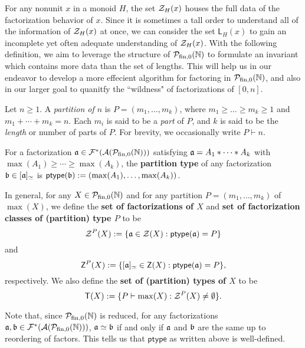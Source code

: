 For any nonunit $x$ in a monoid $H$, the set $\Z_H(x)$ houses the full data of the factorization behavior of $x$. 
Since it is sometimes a tall order to understand all of the information of $\Z_H(x)$ at once, we can consider the set $\mathsf{L}_H(x)$ to gain an incomplete yet often adequate understanding of $\Z_H(x)$.
With the following definition, we aim to leverage the structure of $\PN$ to formulate an invariant which contains more data than the set of lengths.
This will help us in our endeavor to develop a more effecient algorithm for factoring in $\PN$, and also in our larger goal to quanitfy the ``wildness" of factorizations of $[ 0,n]$.


\begin{defn} \label{def:partition type}
	Let $n\ge 1$. A \textit{partition of $n$} is $P = (m_1,\dots, m_k)$, where $m_1 \ge \dots \ge m_k \ge 1$ and $m_1+\cdots + m_k = n$. 
	Each $m_i$ is said to be a \textit{part} of $P$, and $k$ is said to be the \textit{length} or number of parts of $P$.
	For brevity, we occasionally write $P \vdash n$.
	
	For a factorization $\aa \in \F^*(\A(\PN))$ satisfying $\aa = A_1*\cdots*A_k$ with $\max(A_1)\ge\cdots\ge\max(A_k)$, the \textbf{partition type} of any factorization $\bb\in [\aa]_\simeq$ is $\mathsf{ptype}(\bb) := (\max(A_1),\dots,\max(A_k))$.
	
	In general, for any $X \in \PN$ and for any partition $P = (m_1,\dots, m_k)$ of $\max(X)$, we define the \textbf{set of factorizations of $X$} and \textbf{set of factorization classes of (partition) type $P$} to be
	\[ \Z^P(X) := \{ \aa \in \Z(X) : \mathsf{ptype}(\aa) = P \} \]
	and
	\[\mathsf{Z}^P(X) := \{ [\aa]_\simeq \in \mathsf{Z}(X): \mathsf{ptype}(\aa) = P \},\]
	respectively.
	We also define the \textbf{set of (partition) types of $X$} to be
	\[ \mathsf{T}(X) :=  \{ P \vdash \max(X) : \Z^P(X) \neq \emptyset \}. \]
\end{defn}

Note that, since $\PN$ is reduced, for any factorizations $\aa,\bb\in \F^*(\A(\PN))$, $\aa \simeq \bb$ if and only if $\aa$ and $\bb$ are the same up to reordering of factors.  
This tells us that $\mathsf{ptype}$ as written above is well-defined.

